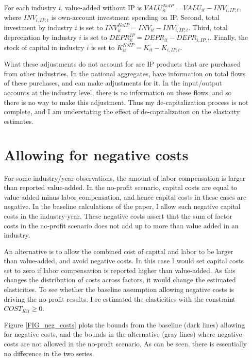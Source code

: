 \documentclass[11pt]{article}
\begin{document}
For each industry $i$, value-added without IP is $VALU_{it}^{NoIP} = VALU_{it} - INV_{i,IP,t}$, where $INV_{i,IP,t}$ is own-account investment spending on IP. Second, total investment by industry $i$ is set to $INV_{it}^{NoIP} = INV_{it} - INV_{i,IP,t}$. Third, total depreciation by industry $i$ is set to $DEPR_{it}^{IP} = DEPR_{it} - DEPR_{i,IP,t}$. Finally, the stock of capital in industry $i$ is set to $K^{NoIP}_{it} = K_{it} - K_{i,IP,t}$. 

What these adjustments do not account for are IP products that are purchased from other industries. In the national aggregates, \cite{ksz2020} have information on total flows of these purchases, and can make adjustments for it. In the input/output accounts at the industry level, there is no information on these flows, and so there is no way to make this adjustment. Thus my de-capitalization process is not complete, and I am understating the effect of de-capitalization on the elasticity estimates.

\section{Allowing for negative costs}
For some industry/year observations, the amount of labor compensation is larger than reported value-added. In the no-profit scenario, capital costs are equal to value-added minus labor compensation, and hence capital costs in these cases are negative. In the baseline calculations of the paper, I allow such negative capital costs in the industry-year. These negative costs assert that the sum of factor costs in the no-profit scenario does not add up to more than value added in an industry. 

An alternative is to allow the combined cost of capital and labor to be larger than value-added, and avoid negative costs. In this case I would set capital costs set to zero if labor compensation is reported higher than value-added. As this changes the distribution of costs across factors, it would change the estimated elasticities. To see whether the baseline assumption allowing negative costs is driving the no-profit results, I re-estimated the elasticities with the constraint $COST_{Kit} \geq 0$. 

Figure \ref{FIG_neg_costs} plots the bounds from the baseline (dark lines) allowing for negative costs, and the bounds in the alternative (gray lines) where negative costs are not allowed in the no-profit scenario. As can be seen, there is essentially no difference in the two series.
\end{document}
